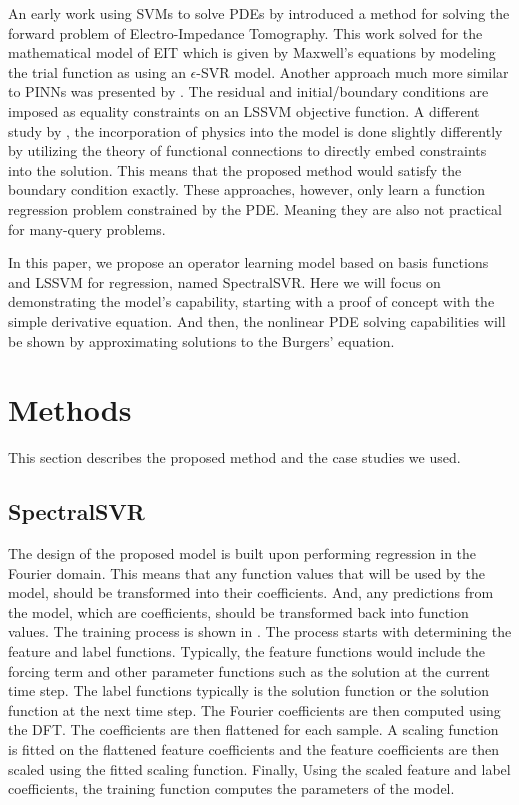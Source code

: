 \documentclass[preprint,12pt,times,authoryear]{elsarticle}
\begin{document}
An early work using SVMs to solve PDEs by \citet{youxiwuSVMSolvingForward2005} introduced a method for solving the forward problem of Electro-Impedance Tomography. This work solved for the mathematical model of EIT which is given by Maxwell's equations by modeling the trial function as using an \(\epsilon \)-SVR model. Another approach much more similar to PINNs was presented by \citet{mehrkanoonLearningSolutionsPartial2015}. The residual and initial/boundary conditions are imposed as equality constraints on an LSSVM objective function. A different study by \citet{leakeAnalyticallyEmbeddingDifferential2019}, the incorporation of physics into the model is done slightly differently by utilizing the theory of functional connections to directly embed constraints into the solution. This means that the proposed method would satisfy the boundary condition exactly. These approaches, however, only learn a function regression problem constrained by the PDE\@. Meaning they are also not practical for many-query problems.

In this paper, we propose an operator learning model based on basis functions and LSSVM for regression, named SpectralSVR\@. Here we will focus on demonstrating the model's capability, starting with a proof of concept with the simple derivative equation. And then, the nonlinear PDE solving capabilities will be shown by approximating solutions to the Burgers' equation.%

\section{Methods}
This section describes the proposed method and the case studies we used.
\subsection{SpectralSVR}
The design of the proposed model is built upon performing regression in the Fourier domain. This means that any function values that will be used by the model, should be transformed into their coefficients. And, any predictions from the model, which are coefficients, should be transformed back into function values. The training process is shown in . The process starts with determining the feature and label functions. Typically, the feature functions would include the forcing term and other parameter functions such as the solution at the current time step. The label functions typically is the solution function or the solution function at the next time step. The Fourier coefficients are then computed using the DFT\@. The coefficients are then flattened for each sample. A scaling function is fitted on the flattened feature coefficients and the feature coefficients are then scaled using the fitted scaling function. Finally, Using the scaled feature and label coefficients, the training function computes the parameters of the model.
\end{document}
